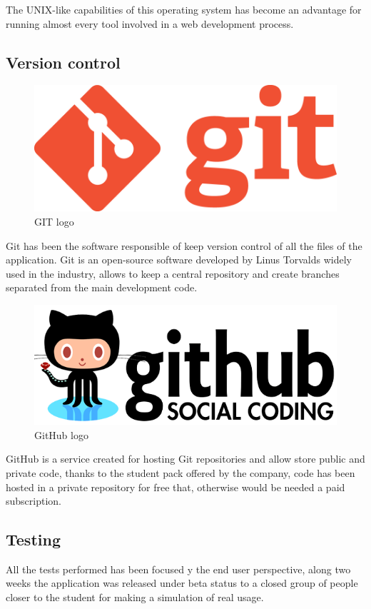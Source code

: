 \documentclass{DeustoFDP}
\begin{document}
The UNIX-like capabilities of this operating system has become an advantage for running almost every tool involved in a web development process.
\subsection{Version control}
\begin{figure}[h]
\centering
\includegraphics[width=0.5\linewidth]{fig/git}
\caption[GIT logo]{GIT logo}
\label{fig:git}
\end{figure}

Git has been the software responsible of keep version control of all the files of the application. Git is an open-source software developed by Linus Torvalds widely used in the industry, allows to keep a central repository and create branches separated from the main development code.

\begin{figure}[h]
\centering
\includegraphics[width=0.7\linewidth]{fig/github-logo}
\caption[GitHub logo]{GitHub logo}
\label{fig:github-logo}
\end{figure}

GitHub is a service created for hosting Git repositories and allow store public and private code, thanks to the student pack offered by the company, code has been hosted in a private repository for free that, otherwise would be needed a paid subscription.
\subsection{Testing}
All the tests performed has been focused y the end user perspective, along two weeks the application was released under beta status to a closed group of people closer to the student for making a simulation of real usage.
\end{document}
